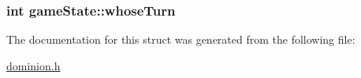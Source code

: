 \subsubsection[{\texorpdfstring{whose\+Turn}{whoseTurn}}]{\setlength{\rightskip}{0pt plus 5cm}int game\+State\+::whose\+Turn}\hypertarget{structgameState_afeb6b7ee4fe3050c7031e91e70d5c7d5}{}\label{structgameState_afeb6b7ee4fe3050c7031e91e70d5c7d5}


The documentation for this struct was generated from the following file\+:\begin{DoxyCompactItemize}
\item 
\hyperlink{dominion_8h}{dominion.\+h}\end{DoxyCompactItemize}
